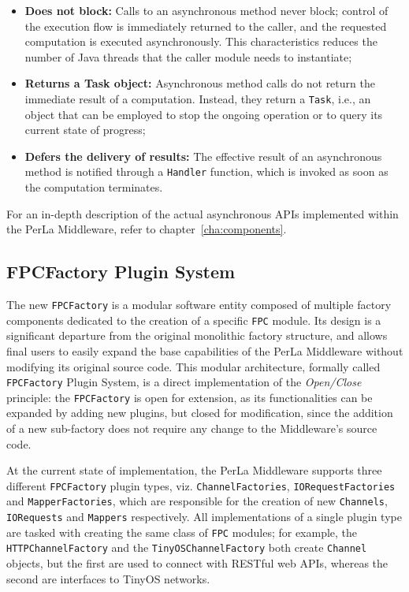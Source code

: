 \begin{itemize}

    \item \textbf{Does not block:} Calls to an asynchronous method never block;
        control of the execution flow is immediately returned to the caller,
        and the requested computation is executed asynchronously. This
        characteristics reduces the number of Java threads that the caller
        module needs to instantiate;

    \item \textbf{Returns a Task object:} Asynchronous method calls do not
        return the immediate result of a computation. Instead, they return a
        \texttt{Task}, i.e., an object that can be employed to stop the ongoing
        operation or to query its current state of progress;

    \item \textbf{Defers the delivery of results:} The effective result of an
        asynchronous method is notified through a \texttt{Handler} function,
        which is invoked as soon as the computation terminates.

\end{itemize}

For an in-depth description of the actual asynchronous APIs implemented within
the PerLa Middleware, refer to chapter~\ref{cha:components}.


\subsection{FPCFactory Plugin System}
\label{sec:newmiddleware.factory}

The new \texttt{FPCFactory} is a modular software entity composed of multiple
factory components dedicated to the creation of a specific \texttt{FPC} module.
Its design is a significant departure from the original monolithic factory
structure, and allows final users to easily expand the base capabilities of the
PerLa Middleware without modifying its original source code. This modular
architecture, formally called \texttt{FPCFactory} Plugin System, is a direct
implementation of the \textit{Open/Close} principle: the \texttt{FPCFactory}
is open for extension, as its functionalities can be expanded by adding new
plugins, but closed for modification, since the addition of a new sub-factory
does not require any change to the Middleware's source code.

At the current state of implementation, the PerLa Middleware supports three
different \texttt{FPCFactory} plugin types, viz. \texttt{ChannelFactories},
\texttt{IORequestFactories} and \texttt{MapperFactories}, which are responsible
for the creation of new \texttt{Channels}, \texttt{IORequests} and
\texttt{Mappers} respectively. All implementations of a single plugin type are
tasked with creating the same class of \texttt{FPC} modules; for example, the
\texttt{HTTPChannelFactory} and the \texttt{TinyOSChannelFactory} both create
\texttt{Channel} objects, but the first are used to connect with RESTful web
APIs, whereas the second are interfaces to TinyOS networks.

